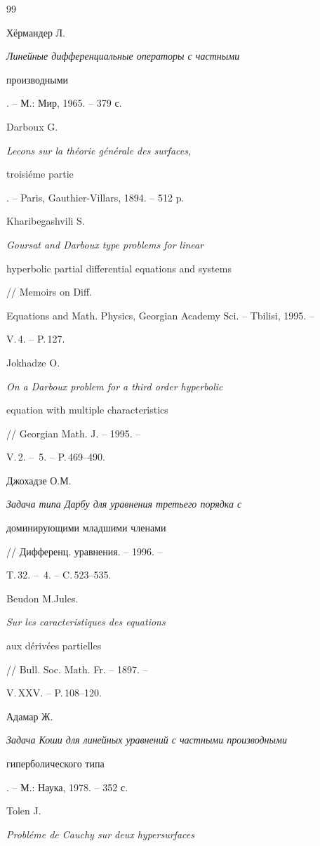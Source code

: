 \begin{thebibliography}{99}





\bibitem{}


Х\"ермандер Л. {\em Линейные дифференциальные операторы с частными


производными}. -- М.: Мир, 1965. -- 379 с.




Darboux G. {\em Lecons sur la th\'eorie g\'en\'erale des surfaces,


troisi\'eme partie}. -- Paris, Gauthier-Villars, 1894. -- 512 p.




Kharibegashvili S. {\em Goursat and Darboux type problems for linear


hyperbolic partial differential equations and systems} // Memoirs on Diff.


Equations and Math. Physics, Georgian Academy Sci. -- Tbilisi, 1995. --


V.\,4. -- P.\,127.




Jokhadze O. {\em On a Darboux problem for a third order hyperbolic


equation with multiple characteristics} // Georgian Math. J. -- 1995. --


V.\,2. -- \No\,5. -- P.\,469--490.




Джохадзе О.М. {\em Задача типа Дарбу для уравнения третьего порядка с


доминирующими младшими членами} // Дифференц. уравнения. -- 1996. --


T.\,32. -- \No\,4. -- C.\,523--535.




Beudon M.Jules. {\em Sur les caracteristiques des equations


aux d\'eriv\'ees partielles} // Bull. Soc. Math. Fr. -- 1897. --


V.\,XXV. -- P.\,108--120.




Адамар Ж. {\em Задача Коши для линейных уравнений с частными производными


гиперболического типа}. -- М.: Наука, 1978. -- 352 с.




Tolen J. {\em Probl\'eme de Cauchy sur deux hypersurfaces


}
\end{thebibliography}
